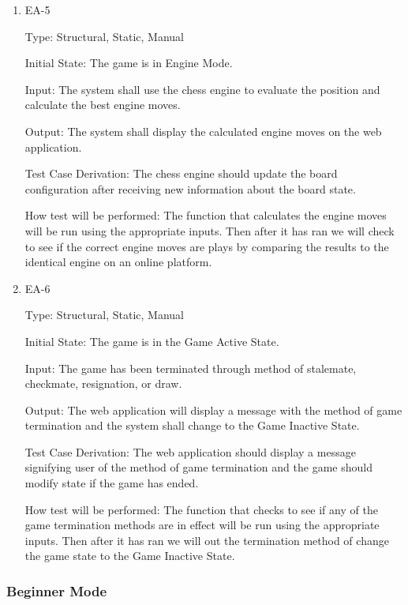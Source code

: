 \documentclass[12pt, titlepage]{article}
\begin{document}
\begin{enumerate}
    \item{EA-5\\}

    Type: Structural, Static, Manual
                      
    Initial State: The game is in Engine Mode.
                        
    Input: The system shall use the chess engine to evaluate the position and calculate the best
    engine moves.
                        
    Output: The system shall display the calculated engine moves on the web application.
                        
    Test Case Derivation: The chess engine should update the board configuration after receiving new information about the board state. 

    How test will be performed: The function that calculates the engine moves
    will be run using the appropriate inputs. Then after it has ran we will check to see if the correct engine moves are plays
    by comparing the results to the identical engine on an online platform.

    \item{EA-6\\}

    Type: Structural, Static, Manual
                      
    Initial State: The game is in the Game Active State.
                        
    Input: The game has been terminated through method of stalemate, checkmate, resignation, or draw.
                        
    Output: The web application will display a message with the method of game termination and the
    system shall change to the Game Inactive State.
                        
    Test Case Derivation: The web application should display a message signifying user of the method of game termination
    and the game should modify state if the game has ended.

    How test will be performed: The function that checks to see if any of the game termination methods are in effect
    will be run using the appropriate inputs. Then after it has ran we will out the termination method of change the
    game state to the Game Inactive State.

  \end{enumerate}
   
  \subsubsection{Beginner Mode}
\end{document}
